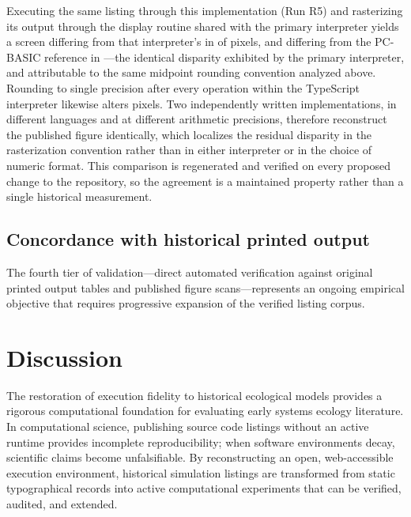 \documentclass[11pt,a4paper]{article}
\begin{document}
Executing the same listing through this implementation (Run R5) and rasterizing its output through the display routine shared with the primary interpreter yields a screen differing from that interpreter's in \oracleEnginesDiffering{} of \oracleScreenPixels{} pixels, and differing from the PC-BASIC reference in \oracleEngineScreenDiffering{}---the identical disparity exhibited by the primary interpreter, and attributable to the same midpoint rounding convention analyzed above. Rounding to single precision after every operation within the TypeScript interpreter likewise alters \oraclePrecisionsDiffering{} pixels. Two independently written implementations, in different languages and at different arithmetic precisions, therefore reconstruct the published figure identically, which localizes the residual disparity in the rasterization convention rather than in either interpreter or in the choice of numeric format. This comparison is regenerated and verified on every proposed change to the repository, so the agreement is a maintained property rather than a single historical measurement.

\subsection{Concordance with historical printed output}

The fourth tier of validation---direct automated verification against original printed output tables and published figure scans---represents an ongoing empirical objective that requires progressive expansion of the verified listing corpus.

\section{Discussion}
\label{sec:discussion}

The restoration of execution fidelity to historical ecological models provides a rigorous computational foundation for evaluating early systems ecology literature. In computational science, publishing source code listings without an active runtime provides incomplete reproducibility; when software environments decay, scientific claims become unfalsifiable. By reconstructing an open, web-accessible execution environment, historical simulation listings are transformed from static typographical records into active computational experiments that can be verified, audited, and extended.
\end{document}
